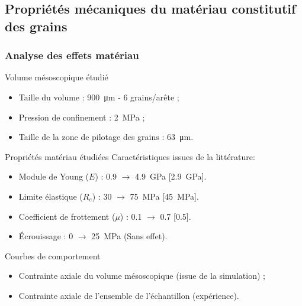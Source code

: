 \documentclass[8pt]{beamer}
\begin{document}
\subsection{Propriétés mécaniques du matériau constitutif des grains}
\begin{frame}
	\frametitle{Analyse des effets matériau}
	\vfill
	\begin{block}{Volume mésoscopique étudié}
		\begin{itemize}[label=$\rightarrow$]
			\item Taille du volume : \SI{900}{\micro\meter} - \num{6} grains/arête ;
			\item Pression de confinement : \SI{2}{\mega\pascal} ;
			\item Taille de la zone de pilotage des grains : \SI{63}{\micro\meter}.
		\end{itemize}
	\end{block}
	\vfill
	\begin{block}{Propriétés matériau étudiées}
		Caractéristiques issues de la littérature\footnotemark[1] :
		\begin{itemize}[label=$\rightarrow$]
			\item Module de Young ($E$) : \num{.9} $\rightarrow$ \SI{4.9}{\giga\pascal} [{\color{red}\SI{2.9}{\giga\pascal}}].
			\item Limite élastique ($R_e$) : \num{30} $\rightarrow$ \SI{75}{\mega\pascal} [{\color{red}\SI{45}{\mega\pascal}}].
			\item Coefficient de frottement ($\mu$) : \num{.1} $\rightarrow$ \num{.7} [{\color{red}\num{.5}}].
			\item \'Ecrouissage : \num{0} $\rightarrow$ \SI{25}{\mega\pascal} ({\color{red}Sans effet}).
		\end{itemize}
	\end{block}
	\vfill
	\begin{block}{Courbes de comportement}
		\begin{itemize}[label=$\rightarrow$]
			\item Contrainte axiale du volume mésoscopique (issue de la simulation) ;
			\item Contrainte axiale de l'ensemble de l'échantillon (expérience).
		\end{itemize}
	\end{block}
	\vfill
\end{frame}
\end{document}
